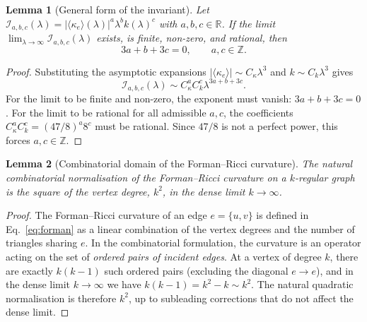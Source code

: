 \documentclass[aps,pre,onecolumn,10pt,groupedaddress,amsmath,amssymb,floatfix]{revtex4-2}
\newtheorem{lemma}{Lemma}
\begin{document}
\begin{lemma}[General form of the invariant]
\label{lem:general_invariant}
Let $\mathcal{I}_{a,b,c}(\lambda) = |\langle\kappa_e\rangle(\lambda)|^{a} \lambda^{b} k(\lambda)^{c}$ with $a,b,c \in \mathbb{R}$. If the limit $\lim_{\lambda\to\infty} \mathcal{I}_{a,b,c}(\lambda)$ exists, is finite, non-zero, and rational, then
\begin{equation}
3a + b + 3c = 0, \qquad a, c \in \mathbb{Z}.
\end{equation}
\end{lemma}
\begin{proof}
Substituting the asymptotic expansions $|\langle\kappa_e\rangle| \sim C_\kappa \lambda^{3}$ and $k \sim C_k \lambda^{3}$ gives
\[
\mathcal{I}_{a,b,c}(\lambda) \sim C_\kappa^{a} C_k^{c} \lambda^{3a + b + 3c}.
\]
For the limit to be finite and non-zero, the exponent must vanish: $3a + b + 3c = 0$. For the limit to be rational for all admissible $a, c$, the coefficients $C_\kappa^{a} C_k^{c} = (47/8)^{a} 8^{c}$ must be rational. Since $47/8$ is not a perfect power, this forces $a, c \in \mathbb{Z}$.
\end{proof}

\begin{lemma}[Combinatorial domain of the Forman--Ricci curvature]
\label{lem:combinatorial_domain}
The natural combinatorial normalisation of the Forman--Ricci curvature on a $k$-regular graph is the square of the vertex degree, $k^2$, in the dense limit $k \to \infty$.
\end{lemma}
\begin{proof}
The Forman--Ricci curvature of an edge $e = \{u, v\}$ is defined in Eq.~\eqref{eq:forman} as a linear combination of the vertex degrees and the number of triangles sharing $e$. In the combinatorial formulation, the curvature is an operator acting on the set of \emph{ordered pairs of incident edges}. At a vertex of degree $k$, there are exactly $k(k-1)$ such ordered pairs (excluding the diagonal $e \to e$), and in the dense limit $k \to \infty$ we have $k(k-1) = k^2 - k \sim k^2$. The natural quadratic normalisation is therefore $k^2$, up to subleading corrections that do not affect the dense limit.
\end{proof}
\end{document}
